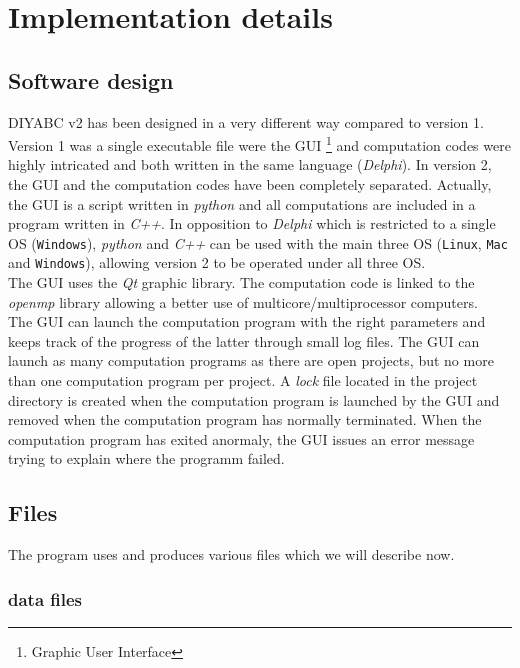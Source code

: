 \clearpage{}


\section{Implementation details}


\subsection{Software design}

DIYABC v2 has been designed in a very different way compared to version
1. Version 1 was a single executable file were the GUI %
\footnote{Graphic User Interface%
} and computation codes were highly intricated and both written in
the same language (\emph{Delphi}). In version 2, the GUI and the computation
codes have been completely separated. Actually, the GUI is a script
written in \emph{python} and all computations are included in a program
written in \emph{C++}. In opposition to \emph{Delphi} which is restricted
to a single OS (\texttt{Windows}), \textit{python} and \textit{C++}
can be used with the main three OS (\texttt{Linux}, \texttt{Mac} and
\texttt{Windows}), allowing version 2 to be operated under all three
OS.\\
 The GUI uses the \textit{Qt} graphic library. The computation code
is linked to the \textit{openmp} library allowing a better use of
multicore/multiprocessor computers.\\
 The GUI can launch the computation program with the right parameters
and keeps track of the progress of the latter through small log files.
The GUI can launch as many computation programs as there are open
projects, but no more than one computation program per project. A
\textit{lock} file located in the project directory is created when
the computation program is launched by the GUI and removed when the
computation program has normally terminated. When the computation
program has exited anormaly, the GUI issues an error message trying
to explain where the programm failed.


\subsection{Files}

The program uses and produces various files which we will describe
now.


\subsubsection{data files}

